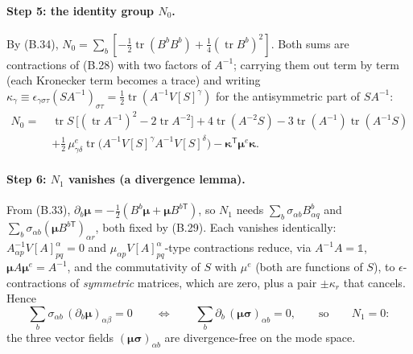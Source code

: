 \paragraph{Step 5: the identity group $N_0$.}
By (B.34), $N_0=\sum_b[-\tfrac12\operatorname{tr}(B^bB^b)+\tfrac14(\operatorname{tr}B^b)^2]$. Both sums are contractions of (B.28) with two factors of $A^{-1}$; carrying them out term by term (each Kronecker term becomes a trace) and writing $\kappa_\gamma\equiv\epsilon_{\gamma\sigma\tau}(SA^{-1})_{\sigma\tau}=\tfrac12\operatorname{tr}(A^{-1}V[S]^{\gamma})$ for the antisymmetric part of $SA^{-1}$:
\begin{align}
N_0=\;&\operatorname{tr}S\,\bigl[(\operatorname{tr}A^{-1})^{2}-2\operatorname{tr}A^{-2}\bigr]
+4\operatorname{tr}(A^{-2}S)-3\operatorname{tr}(A^{-1})\operatorname{tr}(A^{-1}S)\nonumber\\
&+\tfrac12\,\mu^{e}_{\gamma\delta}\operatorname{tr}\bigl(A^{-1}V[S]^{\gamma}A^{-1}V[S]^{\delta}\bigr)
-\boldsymbol\kappa^{\mathsf T}\boldsymbol\mu^{e}\boldsymbol\kappa . \tag{B.35}
\end{align}

\paragraph{Step 6: $N_1$ vanishes (a divergence lemma).}
From (B.33), $\partial_b\boldsymbol\mu=-\tfrac12(B^{b}\boldsymbol\mu+\boldsymbol\mu B^{b\mathsf T})$, so $N_1$ needs $\sum_b\sigma_{\alpha b}B^{b}_{\alpha q}$ and $\sum_b\sigma_{\alpha b}(\boldsymbol\mu B^{b\mathsf T})_{\alpha r}$, both fixed by (B.29). Each vanishes identically: $A^{-1}_{\alpha p}V[A]^{\alpha}_{pq}=0$ and $\mu_{\alpha p}V[A]^{\alpha}_{pq}$-type contractions reduce, via $A^{-1}A=\mathbb 1$, $\boldsymbol\mu A\boldsymbol\mu^{e}=A^{-1}$, and the commutativity of $S$ with $\mu^{e}$ (both are functions of $S$), to $\epsilon$-contractions of \emph{symmetric} matrices, which are zero, plus a pair $\pm\kappa_r$ that cancels. Hence
\begin{equation}
\sum_b\sigma_{\alpha b}\,(\partial_b\boldsymbol\mu)_{\alpha\beta}=0
\qquad\Longleftrightarrow\qquad
\sum_b\partial_b\,(\boldsymbol\mu\boldsymbol\sigma)_{\alpha b}=0,
\qquad\text{so}\qquad N_1=0 : \tag{B.36}
\end{equation}
the three vector fields $(\boldsymbol\mu\boldsymbol\sigma)_{\alpha b}$ are divergence-free on the mode space.

